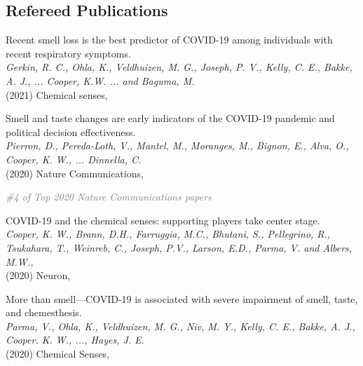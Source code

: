 \documentclass[10pt]{cooperCV2}
\begin{document}
 






\vspace{0.1in}
\subsection{Refereed Publications}

\begin{etaremune}[ resume, itemindent=-\bibhang, topsep=0pt,
				   itemsep=\bibsep,partopsep=0pt,parsep=0pt,leftmargin={\bibhang+\widthof{[999]}}] 
    
    \item Recent smell loss is the best predictor of COVID-19 among individuals with recent respiratory symptoms. \\
     \textit{Gerkin, R. C., Ohla, K., Veldhuizen, M. G., Joseph, P. V., Kelly, C. E., Bakke, A. J., ... Cooper, K.W. ... and Baguma, M. }\\
     (2021) Chemical senses, 
     
	
    \item Smell and taste changes are early indicators of the COVID-19 pandemic and political decision effectiveness. \\
     \textit{Pierron, D., Pereda-Loth, V., Mantel, M., Moranges, M., Bignon, E., Alva, O.,  Cooper, K. W., ... Dinnella, C. }\\
     (2020) Nature Communications, 
     
     	\begin{innerlist}
     	
	     \item  \textcolor{grey}{\textit{\#4 of Top 2020 Nature Communications papers} }
     	
     	\end{innerlist}
     
	
    \item COVID-19 and the chemical senses: supporting players take center stage. \\
     \textit{Cooper, K. W., Brann, D.H., Farruggia, M.C., Bhutani, S., Pellegrino, R., Tsukahara, T., Weinreb, C., Joseph, P.V., Larson, E.D., Parma, V. and Albers, M.W.,}\\
     (2020) Neuron, 
     
	
    \item More than smell—COVID-19 is associated with severe impairment of smell, taste, and chemesthesis. \\
     \textit{Parma, V., Ohla, K., Veldhuizen, M. G., Niv, M. Y., Kelly, C. E., Bakke, A. J., Cooper. K. W., ..., Hayes, J. E.}\\
     (2020) Chemical Senses, 
     

\end{etaremune}
\end{document}
